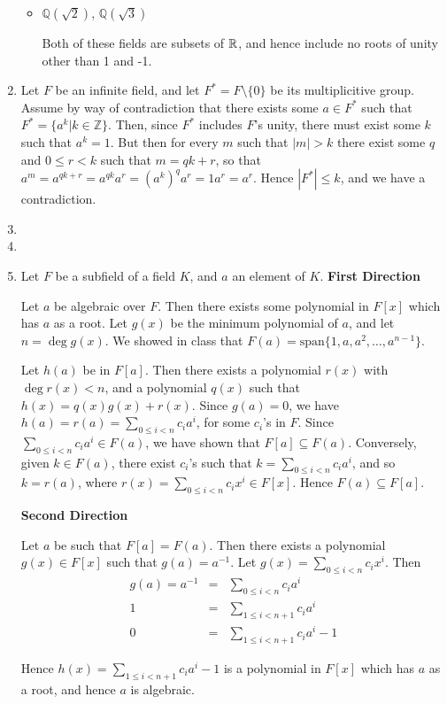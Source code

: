 \documentclass[11pt]{article} \usepackage{amssymb}
\newcommand{\Q}{\mathbb Q}
\newcommand{\Z}{\mathbb Z} \newcommand{\CalE}{{\mathcal{E}}}
\begin{document}
\begin{enumerate}
\begin{itemize}
    \item $\Q(\sqrt{2})$, $\Q(\sqrt{3})$

      Both of these fields are subsets of $\mathbb R$, and hence include no
      roots of unity other than 1 and -1.


    \end{itemize}
  \item Let $F$ be an infinite field, and let $F^*=F \setminus \{0\}$ be
    its multiplicitive group. Assume by way of contradiction that
    there exists some $a\in F^*$ such that $F^*=\{a^k | k \in \Z\}$. Then, since 
    $F^*$ includes $F$'s unity, there must exist some $k$ such that
    $a^k=1$. But then
    for every $m$ such that $|m|>k$ there exist some $q$ and $0\leq r<k$ 
    such that $m=qk+r$, so that  $a^m=a^{qk+r}=a^{qk}a^r=\left(a^{k}\right)^qa^r=1a^r=a^r$.
    Hence $|F^*| \leq k$, and we have a contradiction.
  \item
  \item
  \item
    Let $F$ be a subfield of a field $K$, and $a$ an element of $K$.
    {\bf First Direction}

    Let $a$ be algebraic over $F$. Then there exists some polynomial in $F[x]$
    which has $a$ as a root. Let $g(x)$ be the minimum polynomial of $a$, and
    let $n=\deg g(x)$. 
    We showed in class that $F(a)=\mbox{span}\{1, a, a^2, \ldots, a^{n-1}\}$. 
    
    Let $h(a)$ be in $F[a]$. 
    Then there exists a polynomial
    $r(x)$ with $\deg r(x) < n$, and a polynomial $q(x)$ such that 
    $h(x)=q(x)g(x)+r(x)$. Since $g(a)=0$, we have 
    $h(a)=r(a)=\sum_{0\leq i <n}c_ia^i$, for some $c_i$'s in $F$. Since
    $\sum_{0\leq i <n}c_ia^i \in F(a)$, we have shown that $F[a] \subseteq F(a)$. 
    Conversely, given $k \in F(a)$, there exist $c_i$'s such that $k=\sum_{0\leq i <n}c_ia^i$,
    and so $k=r(a)$, where $r(x)=\sum_{0\leq i <n}c_ix^i \in F[x]$. 
    Hence $F(a) \subseteq F[a]$.

    {\bf Second Direction}

    Let $a$ be such that $F[a]=F(a)$. Then there exists a polynomial 
    $g(x) \in F[x]$ such that $g(a)=a^{-1}$. Let $g(x)=\sum_{0\leq i < n}c_ix^i$. Then
    \begin{eqnarray*}
      g(a)=a^{-1}&=&\sum_{0\leq i < n}c_ia^i
      \\ 1 &=& \sum_{1\leq i < n + 1}c_ia^i
      \\ 0 &=& \sum_{1\leq i < n + 1}c_ia^i - 1
    \end{eqnarray*}
    
    Hence $h(x)=\sum_{1\leq i < n + 1}c_ia^i - 1$ is a polynomial in $F[x]$ which
    has $a$ as a root, and hence $a$ is algebraic.

\end{enumerate}
\end{document}
